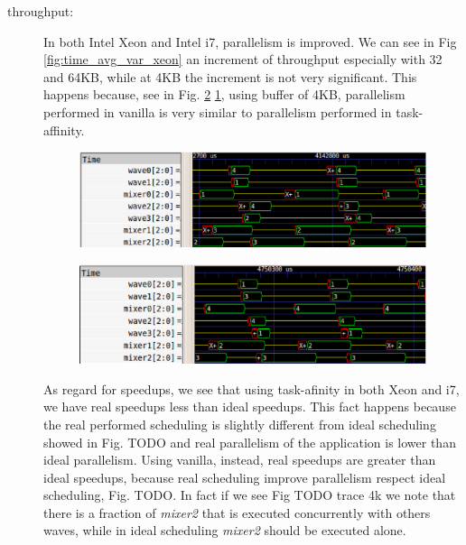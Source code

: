 \begin{description}

\item[throughput:] In both Intel Xeon and Intel i7, parallelism is improved. We can see in Fig \ref{fig:time_avg_var_xeon} an increment of throughput 
especially with 32 and 64KB, while at 4KB the increment is not very significant. This happens because, see in Fig. \ref{fig:4KB_xeon_results_van} 
\ref{fig:4KB_xeon_results_taskaff}, using buffer of 4KB, parallelism performed in vanilla is very similar to parallelism performed in task-affinity.

\begin{figure}[htbp]
\centering
\includegraphics[width=\widefigure]{images/results_xeon/4KB_results_xeon_taskaff.eps}
\caption{}
\label{fig:4KB_xeon_results_taskaff}
\end{figure}

\begin{figure}[htbp]
\centering
\includegraphics[width=\widefigure]{images/results_xeon/4KB_results_xeon_van.eps}
\caption{}
\label{fig:4KB_xeon_results_van}
\end{figure}

As regard for speedups, we see that using task-afinity in both Xeon and i7, we have real speedups less than ideal speedups. This fact happens because the 
real performed scheduling is slightly different from ideal scheduling showed in Fig. TODO and real parallelism of the application is lower than ideal 
parallelism. Using vanilla, instead, real speedups are greater than ideal speedups, because real scheduling improve parallelism respect ideal scheduling, 
Fig. TODO. In fact if we see Fig TODO trace 4k we note that there is a fraction of \textit{mixer2} that is executed concurrently with others waves, while in
ideal scheduling \textit{mixer2} should be executed alone.


\end{description}
